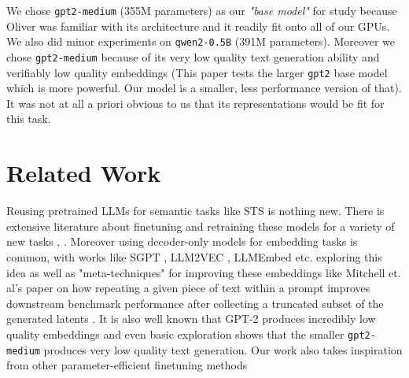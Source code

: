 \documentclass[14pt]{article}
\begin{document}
\begin{enumerate}
\end{enumerate}
We chose \verb|gpt2-medium| (355M parameters) as our \textit{"base model"} for study because Oliver was familiar with its architecture and it readily fit onto all of our GPUs. We also did minor experiments on \verb|qwen2-0.5B| (391M parameters). Moreover we chose \verb|gpt2-medium| because of its very low quality text generation ability and verifiably low quality embeddings \cite{ethayarajh2019contextualcontextualizedwordrepresentations} (This paper tests the larger \verb|gpt2| base model which is more powerful. Our model is a smaller, less performance version of that). It was not at all a priori obvious to us that its representations would be fit for this task.
\section{Related Work}
Reusing pretrained LLMs for semantic tasks like STS is nothing new. There is extensive literature about finetuning and retraining
these models for a variety of new tasks \cite{reimers2019sentencebertsentenceembeddingsusing}, \cite{tang2024poolingattentioneffectivedesigns}. Moreover using decoder-only models for embedding tasks is common, with works like
SGPT \cite{muennighoff2022sgptgptsentenceembeddings}, LLM2VEC \cite{LLM2Vec}, LLMEmbed \cite{LLMEmbed} etc. exploring this idea as well as "meta-techniques" for improving these embeddings like Mitchell et. al's paper on how repeating a given piece of text within a prompt improves downstream benchmark performance after collecting a truncated subset of the generated latents \cite{RepImprovesLLM}. It is also well known that GPT-2 produces incredibly low quality embeddings \cite{ethayarajh2019contextualcontextualizedwordrepresentations} and even basic exploration shows that the smaller \verb|gpt2-medium| produces very low quality text generation.
Our work also takes inspiration from other parameter-efficient finetuning methods

\end{document}
